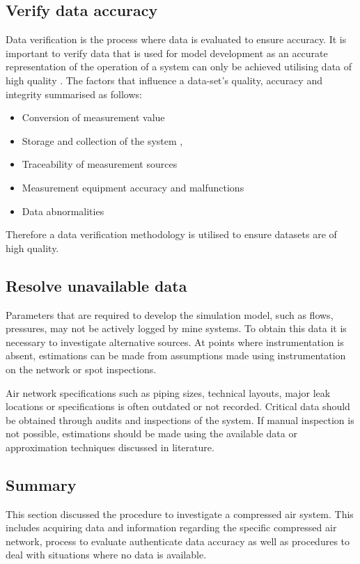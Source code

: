 	\subsection{Verify data accuracy}
	Data verification is the process where data is evaluated to ensure accuracy. It is important to verify data that is used for model development as an accurate representation of the operation of a system can only be achieved utilising data of high quality \cite{gous2016data}. The factors that influence a data-set's quality, accuracy and integrity  summarised as follows:
	\begin{itemize}
		\item Conversion of measurement value \cite{meijsen2015verification}
		\item Storage and collection of the system \cite{vanNiekerk2016quantification},\cite{Jansevan2016structuring}
		\item Traceability of measurement sources \cite{Jansevan2016structuring}
		\item Measurement equipment accuracy and malfunctions \cite{gous2016data}
		\item Data abnormalities \cite{gous2016data}
	\end{itemize} 
	\par 
	Therefore a data verification methodology is utilised to ensure datasets are of high quality. 
	\subsection{Resolve unavailable data}
		Parameters that are required to develop the simulation model, such as flows, pressures, may not be actively logged by mine systems. To obtain this data it is necessary to investigate alternative sources. At points where instrumentation is absent, estimations can be made from assumptions made using instrumentation on the network or spot inspections.
		\par 
		Air network specifications such as piping sizes, technical layouts, major leak locations or specifications is often outdated or not recorded. Critical data should be obtained through audits and inspections of the system. If manual inspection is not possible, estimations should be made using the available data or approximation techniques discussed in literature. %
	
	\subsection{Summary}	
	This section discussed the procedure to investigate a compressed air system. This includes acquiring data and information regarding the specific compressed air network, process to evaluate authenticate data accuracy as well as procedures to deal with situations where no data is available.
